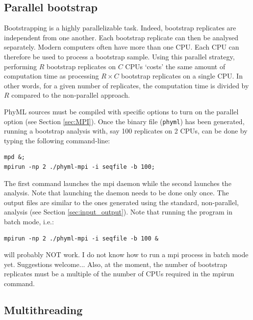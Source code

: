 \documentclass[a4paper,12pt]{article}
\newcommand{\x}[1]{\texttt{#1}}
\begin{document}
\subsection{Parallel  bootstrap}\label{sec:parallel_bootstrap}

Bootstrapping is  a highly  parallelizable task. Indeed,  bootstrap replicates are  independent from
one another.   Each bootstrap replicate can then  be analysed separately. Modern  computers often have
more than one CPU. Each CPU can therefore be used to process a bootstrap sample. Using this parallel
strategy, performing  $R$ bootstrap replicates  on $C$ CPUs  `costs' the same amount  of computation
time as processing $R  \times C$ bootstrap replicates on a single CPU.  In  other words, for a given
number of replicates, the computation time is divided by $R$ compared to the non-parallel approach.

PhyML sources  must be compiled with  specific options to turn  on the parallel  option (see Section
\ref{sec:MPI}). Once  the binary file (\x{phyml})  has been generated, running  a bootstrap analysis
with, say 100 replicates on 2 CPUs, can be done by typing the following command-line:
\begin{verbatim}
mpd &;
mpirun -np 2 ./phyml-mpi -i seqfile -b 100;
\end{verbatim}
The  first command  launches  the mpi  daemon  while the  second launches  the  analysis. Note  that
launching the daemon needs to be done only once.  The output files are similar to the ones generated
using the standard, non-parallel, analysis (see Section \ref{sec:input_output}). Note that running
the program in batch mode, i.e.:
\begin{verbatim}
mpirun -np 2 ./phyml-mpi -i seqfile -b 100 &
\end{verbatim}
will probably NOT work. I do not know how to run a mpi process in batch mode yet. Suggestions welcome...
Also, at the moment, the number of bootstrap replicates must be a multiple of the number of CPUs
required in the mpirun command.

\subsection{Multithreading}\label{sec:threads}
\end{document}
